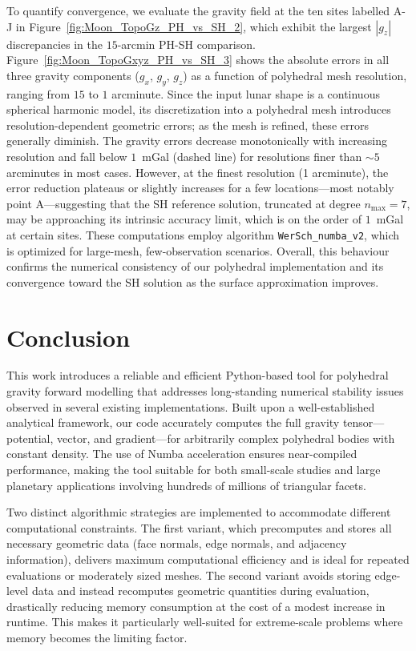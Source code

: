 \documentclass{seg}
\begin{document}
To quantify convergence, we evaluate the gravity field at the ten sites labelled A-J in Figure~\ref{fig:Moon_TopoGz_PH_vs_SH_2}, which exhibit the largest $|g_z|$ discrepancies in the $15$-arcmin PH-SH comparison. Figure~\ref{fig:Moon_TopoGxyz_PH_vs_SH_3} shows the absolute errors in all three gravity components ($g_x$, $g_y$, $g_z$) as a function of polyhedral mesh resolution, ranging from $15$ to $1$ arcminute. Since the input lunar shape is a continuous spherical harmonic model, its discretization into a polyhedral mesh introduces resolution-dependent geometric errors; as the mesh is refined, these errors generally diminish. The gravity errors decrease monotonically with increasing resolution and fall below $1$~mGal (dashed line) for resolutions finer than $\sim\!5$ arcminutes in most cases. However, at the finest resolution (1 arcminute), the error reduction plateaus or slightly increases for a few locations—most notably point A—suggesting that the SH reference solution, truncated at degree $n_{\text{max}} = 7$, may be approaching its intrinsic accuracy limit, which is on the order of $1$~mGal at certain sites. These computations employ algorithm \texttt{WerSch\_numba\_v2}, which is optimized for large-mesh, few-observation scenarios. Overall, this behaviour confirms the numerical consistency of our polyhedral implementation and its convergence toward the SH solution as the surface approximation improves.

\section{Conclusion}
This work introduces a reliable and efficient Python-based tool for polyhedral gravity forward modelling that addresses long-standing numerical stability issues observed in several existing implementations. Built upon a well-established analytical framework, our code accurately computes the full gravity tensor—potential, vector, and gradient—for arbitrarily complex polyhedral bodies with constant density. The use of Numba acceleration ensures near-compiled performance, making the tool suitable for both small-scale studies and large planetary applications involving hundreds of millions of triangular facets.

Two distinct algorithmic strategies are implemented to accommodate different computational constraints. The first variant, which precomputes and stores all necessary geometric data (face normals, edge normals, and adjacency information), delivers maximum computational efficiency and is ideal for repeated evaluations or moderately sized meshes. The second variant avoids storing edge-level data and instead recomputes geometric quantities during evaluation, drastically reducing memory consumption at the cost of a modest increase in runtime. This makes it particularly well-suited for extreme-scale problems where memory becomes the limiting factor.
\end{document}
